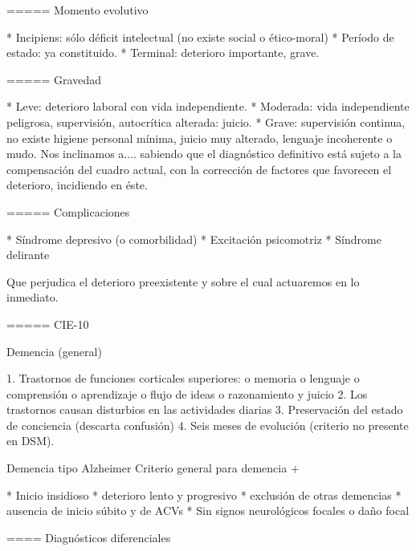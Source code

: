 \documentclass[encares.tex]{subfiles}
\begin{document}
===== Momento evolutivo

* Incipiens: sólo déficit intelectual (no existe social o ético-moral)
* Período de estado: ya constituido.
* Terminal: deterioro importante, grave.

===== Gravedad

* Leve: deterioro laboral con vida independiente.
* Moderada: vida independiente peligrosa, supervisión, autocrítica alterada: juicio.
* Grave: supervisión continua, no existe higiene personal mínima, juicio muy alterado, lenguaje incoherente o mudo. Nos inclinamos a.... sabiendo que el diagnóstico definitivo está sujeto a la compensación del cuadro actual, con la corrección de factores que favorecen el deterioro, incidiendo en éste.

===== Complicaciones

* Síndrome depresivo (o comorbilidad)
* Excitación psicomotriz
* Síndrome delirante

Que perjudica el deterioro preexistente y sobre el cual actuaremos en lo inmediato.

===== CIE-10

Demencia (general)

1. Trastornos de funciones corticales superiores: o memoria o lenguaje o comprensión o aprendizaje o flujo de ideas o razonamiento y juicio
2. Los trastornos causan disturbios en las actividades diarias
3. Preservación del estado de conciencia (descarta confusión)
4. Seis meses de evolución (criterio no presente en DSM).

Demencia tipo Alzheimer Criterio general para demencia +

* Inicio insidioso
* deterioro lento y progresivo
* exclusión de otras demencias
* ausencia de inicio súbito y de ACVs
* Sin signos neurológicos focales o daño focal

==== Diagnósticos diferenciales
\end{document}
